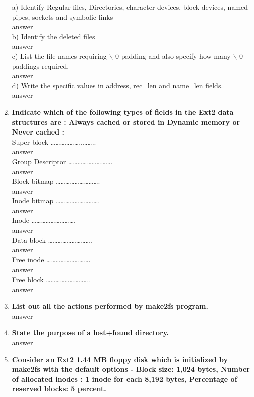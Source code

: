 \documentclass[a4paper,12pt]{article}
\begin{document}
\begin{flushleft}
\begin{enumerate}
\begin{figure}[H]
  \label{fig:12}
\end{figure}
a) Identify Regular files, Directories, character devices, block devices, named pipes, sockets and symbolic links\\
{\color{red}answer}\\
b) Identify the deleted files\\
{\color{red}answer}\\
c) List the file names requiring $\backslash$ 0 padding and also specify how many $\backslash$ 0 paddings required.\\
{\color{red}answer}\\
d) Write the specific values in address, rec\_len and name\_len fields.\\
{\color{red}answer}\\
\item \textbf{ Indicate which of the following types of fields in the Ext2 data structures are :
Always cached or stored in Dynamic memory or Never cached :}\\
Super block ………………..……..\\{\color{red}answer}\\
Group Descriptor ……………………….\\{\color{red}answer}\\
Block bitmap ……………………….\\{\color{red}answer}\\
Inode bitmap ……………………….\\{\color{red}answer}\\
Inode ……………………….\\{\color{red}answer}\\
Data block ……………………….\\{\color{red}answer}\\
Free inode ……………………….\\{\color{red}answer}\\
Free block ……………………….\\{\color{red}answer}\\
\item \textbf{ List out all the actions performed by make2fs program.}\\
{\color{red}answer}\\
\item \textbf{ State the purpose of a lost+found directory.}\\
{\color{red}answer}\\
\item \textbf{ Consider an Ext2 1.44 MB floppy disk which is initialized by make2fs with the default options - Block size: 1,024 bytes, Number of allocated inodes : 1 inode for each 8,192 bytes, Percentage of reserved blocks: 5 percent.
}
\end{enumerate}
\end{flushleft}
\end{document}
